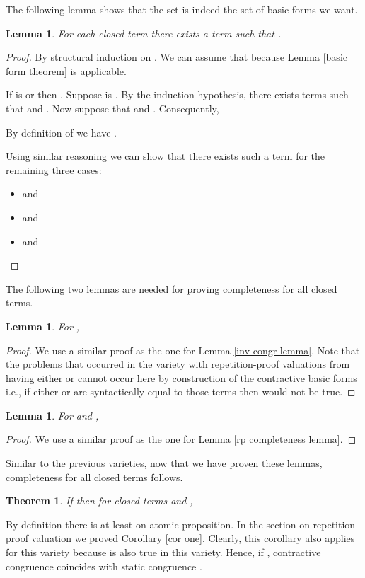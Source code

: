 \documentclass[a4paper,twoside,openright]{report}
\newtheorem{lem}[theorem]{Lemma}
\newtheorem{thm}[theorem]{Theorem}
\begin{document}
The following lemma shows that the set  is indeed the set of basic forms we want.
\begin{lem}
For each closed term  there exists a term  such
that .
\end{lem}
\begin{proof}
By structural induction on . We can assume that  because Lemma \ref{basic form theorem} is applicable.

If  is  or  then . Suppose  is . By the induction hypothesis,
there exists terms  such that 
and . Now suppose that  and . Consequently,

By definition of  we have .

Using similar reasoning we can show that there exists such a term
 for the remaining three cases:
\begin{itemize}
\item  and 
\item  and 
\item  and 
\end{itemize}
\end{proof}
The following two lemmas are needed for proving completeness for all closed terms.
\begin{lem}
For ,

\end{lem}
\begin{proof}
We use a similar proof as the one for Lemma \ref{inv congr lemma}. Note that the problems that occurred in the variety with repetition-proof valuations from having either  or  cannot occur here by construction of the contractive basic forms i.e., if either  or  are syntactically equal to those terms then  would not be true.
\end{proof}
\begin{lem}\label{cr completeness lemma}
For  and ,

\end{lem}
\begin{proof}
We use a similar proof as the one for Lemma \ref{rp completeness lemma}.
\end{proof} 
Similar to the previous varieties, now that we have proven these lemmas, completeness for all closed terms follows.
\begin{thm}
If  then for closed terms  and ,

\end{thm}
By definition there is at least on atomic proposition. In the section on repetition-proof valuation we proved Corollary \ref{cor one}. Clearly, this corollary also applies for this variety because  is also true in this variety. Hence, if , contractive congruence  coincides with static congruence .
\end{document}
